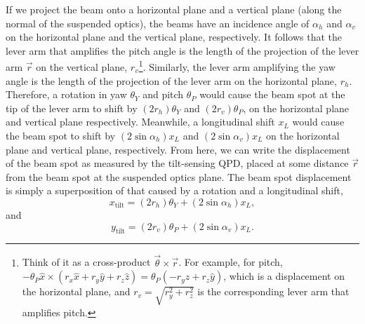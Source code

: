 If we project the beam onto a horizontal plane and a vertical plane (along the normal of the suspended optics), the beams have an incidence angle of $\alpha_h$ and $\alpha_v$ on the horizontal plane and the vertical plane, respectively.
It follows that the lever arm that amplifies the pitch angle is the length of the projection of the lever arm $\vec{r}$ on the vertical plane, $r_v$\footnote{Think of it as a cross-product $\vec{\theta}\times\vec{r}$. For example, for pitch, $-\theta_P\hat{x}\times\left(r_x\hat{x}+r_y\hat{y}+r_z\hat{z}\right) = \theta_P\left(-r_y\hat{z}+r_z\hat{y}\right)$, which is a displacement on the horizontal plane, and $r_v=\sqrt{r_y^2+r_z^2}$ is the corresponding lever arm that amplifies pitch.}.
Similarly, the lever arm amplifying the yaw angle is the length of the projection of the lever arm on the horizontal plane, $r_h$.
Therefore, a rotation in yaw $\theta_Y$ and pitch $\theta_P$ would cause the beam spot at the tip of the lever arm to shift by $\left(2r_h\right)\theta_Y$ and $\left(2r_v\right)\theta_P$, on the horizontal plane and vertical plane respectively.
Meanwhile, a longitudinal shift $x_L$ would cause the beam spot to shift by $\left(2\sin\alpha_h\right)x_L$ and $\left(2\sin\alpha_v\right)x_L$ on the horizontal plane and vertical plane, respectively.
From here, we can write the displacement of the beam spot as measured by the tilt-sensing QPD, placed at some distance $\vec{r}$ from the beam spot at the suspended optics plane.
The beam spot displacement is simply a superposition of that caused by a rotation and a longitudinal shift,
\begin{equation}
	x_\mathrm{tilt} = \left(2r_h\right)\theta_Y + \left(2\sin\alpha_h\right)x_L,
	\label{eqn:x_tilt}
\end{equation}
and
\begin{equation}
	y_\mathrm{tilt} = \left(2r_v\right)\theta_P + \left(2\sin\alpha_v\right)x_L.
	\label{eqn:y_tilt}
\end{equation}

